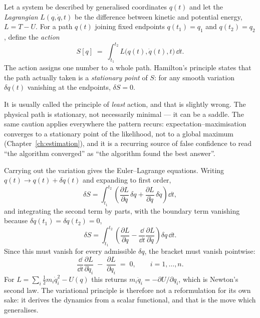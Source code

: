 Let a system be described by generalised coordinates $q(t)$ and let the
\emph{Lagrangian} $L(q, \dot q, t)$ be the difference between kinetic and
potential energy, $L = T - U$. For a path $q(t)$ joining fixed endpoints
$q(t_1) = q_1$ and $q(t_2) = q_2$, define the \emph{action}
\begin{equation}
  S[q] \;=\; \int_{t_1}^{t_2} L\big(q(t), \dot q(t), t\big)\,\dd t .
  \label{eq:action}
\end{equation}
The action assigns one number to a whole path. Hamilton's principle states
that the path actually taken is a \emph{stationary point} of $S$: for any
smooth variation $\delta q(t)$ vanishing at the endpoints,
$\delta S = 0$.

\begin{remark}
It is usually called the principle of \emph{least} action, and that is
slightly wrong. The physical path is stationary, not necessarily minimal ---
it can be a saddle. The same caution applies everywhere the pattern recurs:
expectation--maximisation converges to a stationary point of the likelihood,
not to a global maximum (Chapter~\ref{ch:estimation}), and it is a recurring
source of false confidence to read ``the algorithm converged'' as ``the
algorithm found the best answer''.
\end{remark}

Carrying out the variation gives the Euler--Lagrange equations. Writing
$q(t) \to q(t) + \delta q(t)$ and expanding to first order,
\[
  \delta S = \int_{t_1}^{t_2}
  \left(\frac{\partial L}{\partial q}\,\delta q
      + \frac{\partial L}{\partial \dot q}\,\delta \dot q\right)\dd t ,
\]
and integrating the second term by parts, with the boundary term vanishing
because $\delta q(t_1) = \delta q(t_2) = 0$,
\[
  \delta S = \int_{t_1}^{t_2}
  \left(\frac{\partial L}{\partial q}
      - \frac{\dd}{\dd t}\frac{\partial L}{\partial \dot q}\right)\delta q \,\dd t .
\]
Since this must vanish for every admissible $\delta q$, the bracket must
vanish pointwise:
\begin{equation}
  \frac{\dd}{\dd t}\frac{\partial L}{\partial \dot q_i}
  \;-\; \frac{\partial L}{\partial q_i} \;=\; 0,
  \qquad i = 1, \dots, n.
  \label{eq:euler-lagrange}
\end{equation}
For $L = \sum_i \tfrac12 m_i \dot q_i^2 - U(q)$ this returns
$m_i \ddot q_i = -\partial U/\partial q_i$, which is Newton's second law. The
variational principle is therefore not a reformulation for its own sake: it
derives the dynamics from a scalar functional, and that is the move which
generalises.

